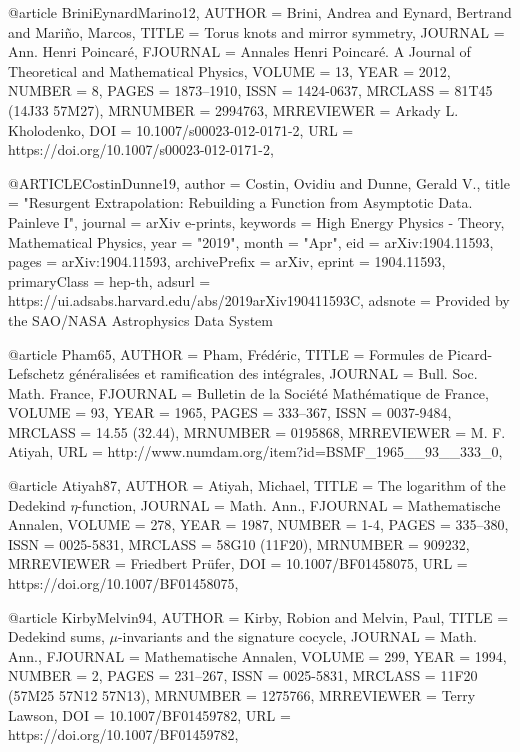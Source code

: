 @article {BriniEynardMarino12,
    AUTHOR = {Brini, Andrea and Eynard, Bertrand and Mari\~{n}o, Marcos},
     TITLE = {Torus knots and mirror symmetry},
   JOURNAL = {Ann. Henri Poincar\'{e}},
  FJOURNAL = {Annales Henri Poincar\'{e}. A Journal of Theoretical and
              Mathematical Physics},
    VOLUME = {13},
      YEAR = {2012},
    NUMBER = {8},
     PAGES = {1873--1910},
      ISSN = {1424-0637},
   MRCLASS = {81T45 (14J33 57M27)},
  MRNUMBER = {2994763},
MRREVIEWER = {Arkady L. Kholodenko},
       DOI = {10.1007/s00023-012-0171-2},
       URL = {https://doi.org/10.1007/s00023-012-0171-2},
}

@ARTICLE{CostinDunne19,
       author = {{Costin}, Ovidiu and {Dunne}, Gerald V.},
        title = "{Resurgent Extrapolation: Rebuilding a Function from Asymptotic Data. Painleve I}",
      journal = {arXiv e-prints},
     keywords = {High Energy Physics - Theory, Mathematical Physics},
         year = "2019",
        month = "Apr",
          eid = {arXiv:1904.11593},
        pages = {arXiv:1904.11593},
archivePrefix = {arXiv},
       eprint = {1904.11593},
 primaryClass = {hep-th},
       adsurl = {https://ui.adsabs.harvard.edu/abs/2019arXiv190411593C},
      adsnote = {Provided by the SAO/NASA Astrophysics Data System}
}

@article {Pham65,
    AUTHOR = {Pham, Fr\'{e}d\'{e}ric},
     TITLE = {Formules de {P}icard-{L}efschetz g\'{e}n\'{e}ralis\'{e}es et ramification
              des int\'{e}grales},
   JOURNAL = {Bull. Soc. Math. France},
  FJOURNAL = {Bulletin de la Soci\'{e}t\'{e} Math\'{e}matique de France},
    VOLUME = {93},
      YEAR = {1965},
     PAGES = {333--367},
      ISSN = {0037-9484},
   MRCLASS = {14.55 (32.44)},
  MRNUMBER = {0195868},
MRREVIEWER = {M. F. Atiyah},
       URL = {http://www.numdam.org/item?id=BSMF_1965__93__333_0},
}

@article {Atiyah87,
    AUTHOR = {Atiyah, Michael},
     TITLE = {The logarithm of the {D}edekind {$\eta$}-function},
   JOURNAL = {Math. Ann.},
  FJOURNAL = {Mathematische Annalen},
    VOLUME = {278},
      YEAR = {1987},
    NUMBER = {1-4},
     PAGES = {335--380},
      ISSN = {0025-5831},
   MRCLASS = {58G10 (11F20)},
  MRNUMBER = {909232},
MRREVIEWER = {Friedbert Pr\"{u}fer},
       DOI = {10.1007/BF01458075},
       URL = {https://doi.org/10.1007/BF01458075},
}

@article {KirbyMelvin94,
    AUTHOR = {Kirby, Robion and Melvin, Paul},
     TITLE = {Dedekind sums, {$\mu$}-invariants and the signature cocycle},
   JOURNAL = {Math. Ann.},
  FJOURNAL = {Mathematische Annalen},
    VOLUME = {299},
      YEAR = {1994},
    NUMBER = {2},
     PAGES = {231--267},
      ISSN = {0025-5831},
   MRCLASS = {11F20 (57M25 57N12 57N13)},
  MRNUMBER = {1275766},
MRREVIEWER = {Terry Lawson},
       DOI = {10.1007/BF01459782},
       URL = {https://doi.org/10.1007/BF01459782},
}

